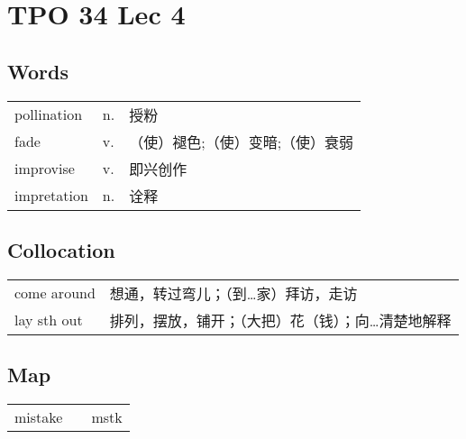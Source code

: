 \section{TPO 34 Lec 4}

\subsection{Words}

\begin{tabular}{lll}
    pollination & n. & 授粉                \\
    fade        & v. & （使）褪色;（使）变暗;（使）衰弱 \\
    improvise   & v. & 即兴创作              \\
    impretation & n. & 诠释                \\
\end{tabular}

\subsection{Collocation}

\begin{tabular}{ll}
    come around & 想通，转过弯儿；（到…家）拜访，走访        \\
    lay sth out & 排列，摆放，铺开；（大把）花（钱）；向…清楚地解释 \\
\end{tabular}

\subsection{Map}

\begin{tabular}{rc@{\quad$\to$\quad}l}
    mistake &  & mstk \\
\end{tabular}
